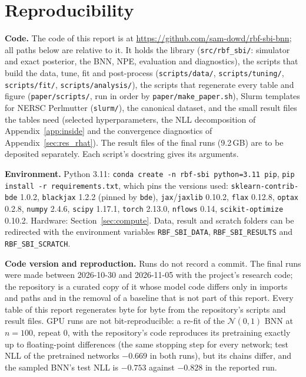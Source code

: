 \documentclass[11pt]{article}
\newcommand{\nzo}{\mathcal{N}(0,1)}
\newcommand{\code}[1]{\texttt{#1}}
\begin{document}
\section{Reproducibility}
\begingroup\raggedright
\label{app:repro}
\textbf{Code.} The code of this report is at \url{https://github.com/sam-dowd/rbf-sbi-bnn}; all paths below are relative
to it. It holds the library (\code{src/rbf\_sbi/}: simulator and exact posterior, the BNN, NPE, evaluation and
diagnostics), the scripts that build the data, tune, fit and post-process (\code{scripts/data/}, \code{scripts/tuning/},
\code{scripts/fit/}, \code{scripts/analysis/}), the scripts that regenerate every table and figure
(\code{paper/scripts/}, run in order by \code{paper/make\_paper.sh}), Slurm templates for NERSC Perlmutter
(\code{slurm/}), the canonical dataset, and the small result files the tables need (selected hyperparameters, the NLL
decomposition of Appendix~\ref{app:inside} and the convergence diagnostics of Appendix~\ref{sec:res_rhat}). The result
files of the final runs (9.2\,GB) are to be deposited separately. Each script's docstring gives its arguments.

\textbf{Environment.} Python 3.11: \code{conda create -n rbf-sbi python=3.11 pip}, \code{pip install -r requirements.txt},
which pins the versions used: \code{sklearn-contrib-bde} 1.0.2, \code{blackjax} 1.2.2 (pinned by \code{bde}),
\code{jax}/\code{jaxlib} 0.10.2, \code{flax} 0.12.8, \code{optax} 0.2.8, \code{numpy} 2.4.6, \code{scipy} 1.17.1,
\code{torch} 2.13.0, \code{nflows} 0.14, \code{scikit-optimize} 0.10.2. Hardware: Section~\ref{sec:compute}. Data, result
and scratch folders can be redirected with the environment variables \code{RBF\_SBI\_DATA}, \code{RBF\_SBI\_RESULTS}
and \code{RBF\_SBI\_SCRATCH}.

\textbf{Code version and reproduction.} Runs do not record a commit. The final runs were made between 2026-10-30 and
2026-11-05 with the project's research code; the repository is a curated copy of it whose model code differs only in
imports and paths and in the removal of a baseline that is not part of this report. Every table of this report
regenerates byte for byte from the repository's scripts and result files. GPU runs are not bit-reproducible: a re-fit
of the $\nzo$ BNN at $n=100$, repeat 0, with the repository's code reproduces its pretraining exactly up to
floating-point differences (the same stopping step for every network; test NLL of the pretrained networks $-0.669$ in
both runs), but its chains differ, and the sampled BNN's test NLL is $-0.753$ against $-0.828$ in the reported run.
\end{document}
